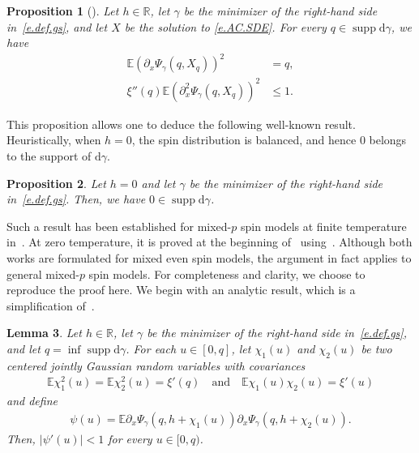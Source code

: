 \documentclass[11pt]{amsart}
\newtheorem{proposition}{Proposition}
\newtheorem{lemma}[proposition]{Lemma}
\theoremstyle{remark}
\theoremstyle{definition}
\numberwithin{equation}{section}
\numberwithin{proposition}{section}
\numberwithin{figure}{section}
\numberwithin{table}{section}
\newcommand{\R}{\mathbb{R}}
\newcommand{\E}{\mathbb{E}}
\renewcommand{\leq}{\leqslant}
\newcommand{\Ll}{\left}
\newcommand{\Rr}{\right}
\renewcommand{\d}{\mathrm{d}}
\newcommand{\1}{\mathbf{1}}
\DeclareMathOperator{\supp}{supp}
\begin{document}
\begin{proposition}[\cite{chen2017fluctuations}]
Let $h\in\R$, let $\gamma$ be the minimizer of the right-hand side in~\eqref{e.def.gs}, and let $X$ be the solution to \eqref{e.AC.SDE}.
For every $q\in\supp\d\gamma$, we have
\begin{align}
    \E \Ll(\partial_x\Psi_\gamma(q,X_q)\Rr)^2 & =q, \label{e.E(dPsi)^2=q}
    \\
    \xi''(q) \E\Ll(\partial_x^2\Psi_\gamma(q,X_q)\Rr)^2 & \leq 1. \label{e.xi''(q)E(d^2Psi)<1}
\end{align}
\end{proposition}

This proposition allows one to deduce the following well-known result. Heuristically, when $h=0$, the spin distribution is balanced, and hence $0$ belongs to the support of $\mathrm{d}\gamma$.


\begin{proposition}\label{p.h=0,0in_supp}
Let $h=0$ and let $\gamma$ be the minimizer of the right-hand side in~\eqref{e.def.gs}. Then, we have $0\in\supp\d\gamma$.
\end{proposition}

Such a result has been established for mixed-$p$ spin models at finite temperature in~\cite{auffinger2015properties}. At zero temperature, it is proved at the beginning of~\cite[Section~3.2]{chen2018energy} using~\cite[Theorem~5]{chen2014chaos}. Although both works are formulated for mixed even spin models, the argument in fact applies to general mixed-$p$ spin models. For completeness and clarity, we choose to reproduce the proof here. We begin with an analytic result, which is a simplification of~\cite[Theorem~5]{chen2014chaos}.


\begin{lemma}\label{l.chi_psi}
Let $h\in\R$, let $\gamma$ be the minimizer of the right-hand side in~\eqref{e.def.gs}, and let $q=\inf\supp\d\gamma$. For each $u\in[0,q]$, let $\chi_1(u)$ and $\chi_2(u)$ be two centered jointly Gaussian random variables with covariances
\begin{align*}
    \E\chi_1^2(u) = \E\chi_2^2(u) = \xi'(q) \quad\text{and}\quad \E\chi_1(u)\chi_2(u)= \xi'(u)
\end{align*}
and define
\begin{align*}
    \psi(u) = \E \partial_x\Psi_\gamma(q,h+\chi_1(u))\partial_x\Psi_\gamma(q,h+\chi_2(u)).
\end{align*}
Then, $|\psi'(u)|<1$ for every $u\in[0,q)$.
\end{lemma}
\end{document}
